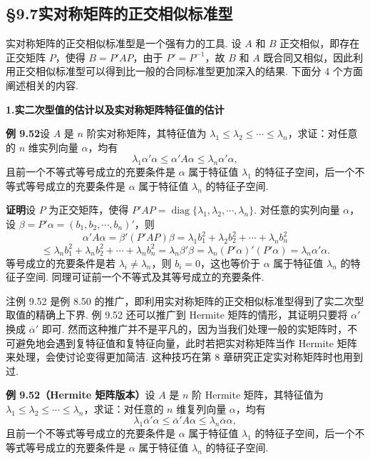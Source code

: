 \documentclass[UTF8,12pt,a4paper,fontset=fandol]{ctexart}
\begin{document}
\subsection*{§9.7\quad 实对称矩阵的正交相似标准型}

实对称矩阵的正交相似标准型是一个强有力的工具. 设 $A$ 和 $B$ 正交相似，即存在正交矩阵 $P$，使得 $B=P'AP$，由于 $P'=P^{-1}$，故 $B$ 和 $A$ 既合同又相似，因此利用正交相似标准型可以得到比一般的合同标准型更加深入的结果. 下面分 4 个方面阐述相关的内容.

\noindent\textbf{1.\quad 实二次型值的估计以及实对称矩阵特征值的估计}

\noindent\textbf{例 9.52}\quad 设 $A$ 是 $n$ 阶实对称矩阵，其特征值为 $\lambda_1\le\lambda_2\le\cdots\le\lambda_n$，求证：对任意的 $n$ 维实列向量 $\alpha$，均有
\[
\lambda_1\alpha'\alpha\le\alpha'A\alpha\le\lambda_n\alpha'\alpha,
\]
且前一个不等式等号成立的充要条件是 $\alpha$ 属于特征值 $\lambda_1$ 的特征子空间，后一个不等式等号成立的充要条件是 $\alpha$ 属于特征值 $\lambda_n$ 的特征子空间.

\noindent\textbf{证明}\quad 设 $P$ 为正交矩阵，使得 $P'AP=\operatorname{diag}\{\lambda_1,\lambda_2,\cdots,\lambda_n\}$. 对任意的实列向量 $\alpha$，设 $\beta=P'\alpha=(b_1,b_2,\cdots,b_n)'$，则
\[
\alpha'A\alpha=\beta'(P'AP)\beta=\lambda_1b_1^2+\lambda_2b_2^2+\cdots+\lambda_nb_n^2
\]
\[
\le \lambda_nb_1^2+\lambda_nb_2^2+\cdots+\lambda_nb_n^2
=\lambda_n\beta'\beta=\lambda_n(P'\alpha)'(P'\alpha)=\lambda_n\alpha'\alpha.
\]
等号成立的充要条件是若 $\lambda_i\ne\lambda_n$，则 $b_i=0$，这也等价于 $\alpha$ 属于特征值 $\lambda_n$ 的特征子空间. 同理可证前一个不等式及其等号成立的充要条件.

注\quad 例 9.52 是例 8.50 的推广，即利用实对称矩阵的正交相似标准型得到了实二次型取值的精确上下界. 例 9.52 还可以推广到 Hermite 矩阵的情形，其证明只要将 $\alpha'$ 换成 $\overline{\alpha}'$ 即可. 然而这种推广并不是平凡的，因为当我们处理一般的实矩阵时，不可避免地会遇到复特征值和复特征向量，此时若把实对称矩阵当作 Hermite 矩阵来处理，会使讨论变得更加简洁. 这种技巧在第 8 章研究正定实对称矩阵时也用到过.

\noindent\textbf{例 9.52（Hermite 矩阵版本）}\quad 设 $A$ 是 $n$ 阶 Hermite 矩阵，其特征值为 $\lambda_1\le\lambda_2\le\cdots\le\lambda_n$，求证：对任意的 $n$ 维复列向量 $\alpha$，均有
\[
\lambda_1\overline{\alpha}'\alpha\le\overline{\alpha}'A\alpha\le\lambda_n\overline{\alpha}\alpha,
\]
且前一个不等式等号成立的充要条件是 $\alpha$ 属于特征值 $\lambda_1$ 的特征子空间，后一个不等式等号成立的充要条件是 $\alpha$ 属于特征值 $\lambda_n$ 的特征子空间.
\end{document}
